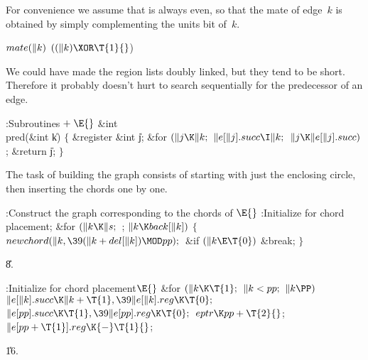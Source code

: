 For convenience we assume that  is always even, so that the
mate
of edge~$k$ is obtained by simply complementing the units bit of~$k$.

\Y\B\4\D$\\{mate}(\|k)$ \5
$((\|k)\XOR\T{1}{}$)\par
\fi

We could have made the region lists doubly linked, but they tend to
be short. Therefore it probably doesn't hurt to search sequentially
for the predecessor of an edge.

\Y\B\4:Subroutines\X${}\mathrel+\E{}$\6
\&{int} \\{pred}(\&{int} \|k)\1\1\2\2\6
${}\{{}$\1\6
\&{register} \&{int} \|j;\7
\&{for} ${}(\|j\K\|k;{}$ ${}\|e[\|j].\\{succ}\I\|k;{}$ ${}\|j\K\|e[\|j].%
\\{succ}){}$\1\5
;\2\6
\&{return} \|j;\6
\4${}\}{}$\2\par
\fi

The task of building the graph consists of starting with just the
enclosing circle, then inserting the chords one by one.

\Y\B\4:Construct the graph corresponding to the chords of \X${}%
\E{}$\6
:Initialize for chord placement\X;\6
\&{for} ${}(\|k\K\|s;{}$  ; ${}\|k\K\\{back}[\|k]){}$\5
${}\{{}$\1\6
${}\\{newchord}(\|k,\39(\|k+\\{del}[\|k])\MOD\\{pp});{}$\6
\&{if} ${}(\|k\E\T{0}){}$\1\5
\&{break};\2\6
\4${}\}{}$\2\par
\U8.\fi

\B{}:Initialize for chord placement\X${}\E{}$\6
\&{for} ${}(\|k\K\T{1};{}$ ${}\|k<\\{pp};{}$ ${}\|k\PP){}$\1\5
${}\|e[\|k].\\{succ}\K\|k+\T{1},\39\|e[\|k].\\{reg}\K\T{0};{}$\2\6
${}\|e[\\{pp}].\\{succ}\K\T{1},\39\|e[\\{pp}].\\{reg}\K\T{0};{}$\6
${}\\{eptr}\K\\{pp}+\T{2}{}$;\6
${}\|e[\\{pp}+\T{1}].\\{reg}\K{-}\T{1}{}$;\par
\U16.\fi

